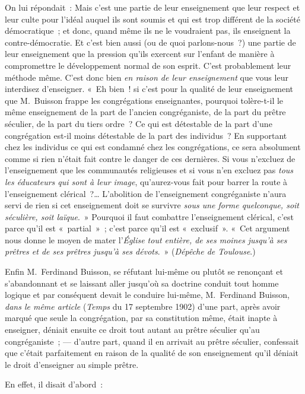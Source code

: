 \documentclass[french,twoside]{book} %
\begin{document}
On lui répondait : Mais c’est une partie de leur enseignement que leur respect et leur culte pour l’idéal auquel ils sont soumis et qui est trop différent de la société démocratique ; et donc, quand même ils ne le voudraient pas, ils enseignent la contre-démocratie. Et c’est bien aussi (ou de quoi parlons-nous ?) une partie de leur enseignement que la pression qu’ils exercent sur l’enfant de manière à compromettre le développement normal de son esprit. C’est probablement leur méthode même. C’est donc bien {\itshape en raison de leur enseignement} que vous leur interdisez d’enseigner. « Eh bien ! si c’est pour la qualité de leur enseignement que M. Buisson frappe les congrégations enseignantes, pourquoi tolère-t-il le même enseignement de la part de l’ancien congréganiste, de la part du prêtre séculier, de la part du tiers ordre ? Ce qui est détestable de la part d’une congrégation est-il moins détestable de la part des individus ? En supportant chez les individus ce qui est condamné chez les congrégations, ce sera absolument comme si rien n’était fait contre  le danger de ces dernières. Si vous n’excluez de l’enseignement que les communautés religieuses et si vous n’en excluez pas {\itshape tous les éducateurs qui sont à leur image}, qu’aurez-vous fait pour barrer la route à l’enseignement clérical ?… L’abolition de l’enseignement congréganiste n’aura servi de rien si cet enseignement doit se survivre {\itshape sous une forme quelconque, soit séculière, soit laïque}. » Pourquoi il faut combattre l’enseignement clérical, c’est parce qu’il est « partial » ; c’est parce qu’il est « exclusif ». « Cet argument nous donne le moyen de mater l’{\itshape Église tout entière, de ses moines jusqu’à ses prêtres et de ses prêtres jusqu’à ses dévots}. » (\emph{Dépêche de Toulouse}.)\par
Enfin M. Ferdinand Buisson, se réfutant lui-même ou plutôt se renonçant et s’abandonnant et se laissant aller jusqu’où sa doctrine conduit tout homme logique et par conséquent devait le conduire lui-même, M. Ferdinand Buisson, {\itshape dans le même article} (\emph{Temps} du 17 septembre 1902) d’une part, après avoir marqué que seule la congrégation, par sa constitution même, était inapte à enseigner, déniait ensuite ce droit tout autant au prêtre séculier qu’au congréganiste ; — d’autre part, quand il en arrivait au prêtre séculier, confessait que c’était parfaitement en raison de la qualité de son enseignement qu’il déniait le droit d’enseigner au simple prêtre.\par
 En effet, il disait d’abord :\par
\end{document}
